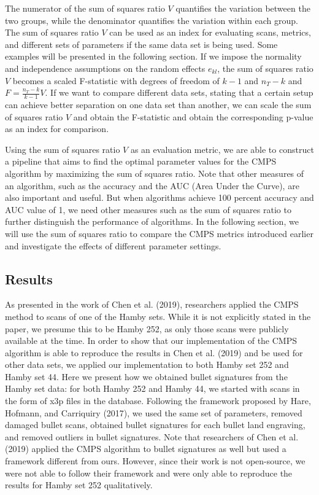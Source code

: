 The numerator of the sum of squares ratio \(V\) quantifies the variation between the two groups, while the denominator quantifies the variation within each group.
The sum of squares ratio \(V\) can be used as an index for evaluating scans, metrics, and different sets of parameters if the same data set is being used.
Some examples will be presented in the following section.
If we impose the normality and independence assumptions on the random effects \(e_{kl}\), the sum of squares ratio \(V\) becomes a scaled F-statistic with degrees of freedom of \(k-1\) and \(n_T - k\) and \(F = \frac{n_T - k}{k- 1} V\).
If we want to compare different data sets, stating that a certain setup can achieve better separation on one data set than another, we can scale the sum of squares ratio \(V\) and obtain the F-statistic and obtain the corresponding p-value as an index for comparison.

Using the sum of squares ratio \(V\) as an evaluation metric, we are able to construct a pipeline that aims to find the optimal parameter values for the CMPS algorithm by maximizing the sum of squares ratio.
Note that other measures of an algorithm, such as the accuracy and the AUC (Area Under the Curve), are also important and useful. But when algorithms achieve 100 percent accuracy and AUC value of 1, we need other measures such as the sum of squares ratio to further distinguish the performance of algorithms. In the following section, we will use the sum of squares ratio to compare the CMPS metrics introduced earlier and investigate the effects of different parameter settings.

\hypertarget{results}{%
\subsection{Results}\label{results}}

As presented in the work of Chen et al. (2019), researchers applied the CMPS method to scans of one of the Hamby sets.
While it is not explicitly stated in the paper, we presume this to be Hamby 252, as only those scans were publicly available at the time.
In order to show that our implementation of the CMPS algorithm is able to reproduce the results in Chen et al. (2019) and be used for other data sets, we applied our implementation to both Hamby set 252 and Hamby set 44.
Here we present how we obtained bullet signatures from the Hamby set data: for both Hamby 252 and Hamby 44, we started with scans in the form of x3p files in the database.
Following the framework proposed by Hare, Hofmann, and Carriquiry (2017), we used the same set of parameters, removed damaged bullet scans, obtained bullet signatures for each bullet land engraving, and removed outliers in bullet signatures.
Note that researchers of Chen et al. (2019) applied the CMPS algorithm to bullet signatures as well but used a framework different from ours.
However, since their work is not open-source, we were not able to follow their framework and were only able to reproduce the results for Hamby set 252 qualitatively.

